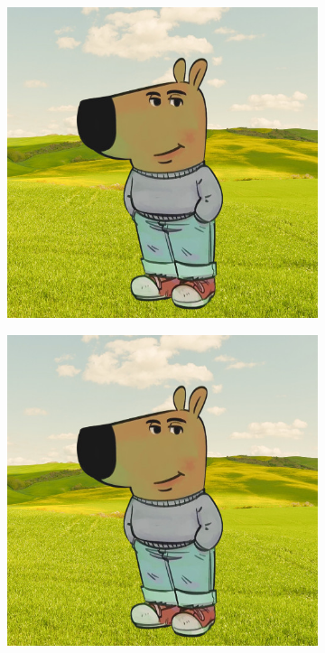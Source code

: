 \begin{figure}[H]
	\centering
	\begin{subfigure}{0.25\textwidth}
		\centering
		\includegraphics[width=\textwidth]{figures/chill-guy.jpeg}
		\label{fig:pic1}
	\end{subfigure}
	\hspace{0.7em}
	\begin{subfigure}{0.35\textwidth}
		\centering
		\includegraphics[width=\textwidth]{figures/chill-guy.jpeg}
		\label{fig:pic2}
	\end{subfigure}
	

\end{figure}
